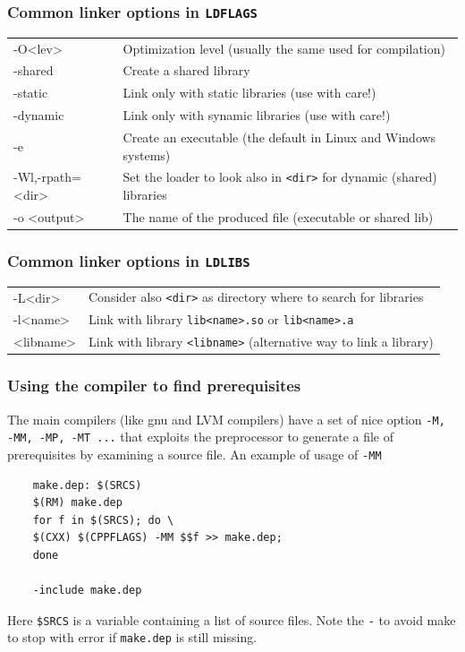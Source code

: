 \documentclass[10pt,aspectratio=169]{beamer}
\begin{document}
\begin{frame}
  \frametitle{Common linker  options in \texttt{LDFLAGS}}
 \hspace*{-0.5cm}
  \begin{tabular}{>{\ttfamily}l|p{}}
    -O<lev>& Optimization level (usually the same used for compilation)\\
    -shared & Create a shared library\\
    -static & Link only with static libraries (use with care!)\\
    -dynamic & Link only with synamic libraries (use with care!)\\
    -e & Create an executable (the default in Linux and Windows  systems)\\
    -Wl,-rpath=<dir>& Set the loader to look also in \texttt{<dir>} for dynamic (shared) libraries\\
    -o <output>& The name of the produced file (executable or shared lib)
  \end{tabular}  
\end{frame}

\begin{frame}
  \frametitle{Common linker  options in \texttt{LDLIBS}}
 \hspace*{-0.5cm}
  \begin{tabular}{>{\ttfamily}l|p{}}
    -L<dir> & Consider also \texttt{<dir>} as directory where to search for libraries\\
    -l<name>& Link with library \texttt{lib<name>.so} or \texttt{lib<name>.a}\\
    <libname> & Link with library \texttt{<libname>} (alternative way to link a library)
  \end{tabular}  
\end{frame}

\begin{frame}[fragile]
    \frametitle{Using the compiler to find prerequisites}
    The main compilers (like gnu and LVM compilers) have a set of nice
    option \texttt{-M, -MM, -MP, -MT ...} that exploits the preprocessor to generate a file of prerequisites by examining a source file. An example of usage of \texttt{-MM}
    \begin{verbatim}
    make.dep: $(SRCS)
    $(RM) make.dep
    for f in $(SRCS); do \
    $(CXX) $(CPPFLAGS) -MM $$f >> make.dep;
    done
    
    -include make.dep
    \end{verbatim}
    Here \texttt{\$SRCS} is a variable containing a list of source files.
    Note the \texttt{-} to avoid make to stop with error if \texttt{make.dep} is still missing.
\end{frame}
\end{document}
